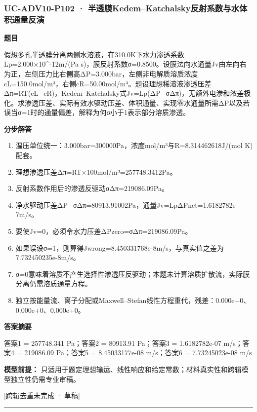 \documentclass[UTF8,11pt,a4paper]{ctexart}
\begin{document}
\subsubsection*{UC-ADV10-P102 · 半透膜Kedem–Katchalsky反射系数与水体积通量反演}
\noindent\textbf{题目}\par
假想多孔半透膜分离两侧水溶液，在310.0K下水力渗透系数Lp=2.000×10\textasciicircum{}-12m/(Pa s)，膜反射系数σ=0.8500。设膜法向水通量Jv由左向右为正，左侧压力比右侧高ΔP=3.000bar，左侧非电解质溶质浓度cL=150.0mol/m³，右侧cR=50.00mol/m³。题设理想稀溶液渗透压差Δπ=RT(cL−cR)，Kedem–Katchalsky式Jv=Lp(ΔP−σΔπ)，无额外电渗和浓差极化。求渗透压差、实际有效水驱动压差、体积通量、实现零水通量所需ΔP以及若误当σ=1时的通量偏差，解释为何σ小于1表示部分溶质渗透。\par
\medskip\noindent\textbf{分步解答}
\begin{enumerate}
\item 温压单位统一：3.000bar=300000Pa，浓度mol/m³与R=8.314462618J/(mol K)配套。
\item 理想渗透压差Δπ=RT×100mol/m³=257748.3412Pa。
\item 反射系数作用后的渗透反驱动σΔπ=219086.09Pa。
\item 净水驱动压差ΔP−σΔπ=80913.91002Pa，通量Jv=LpΔPnet=1.6182782e-7m/s。
\item 要使Jv=0，必须令水力压差ΔPzero=σΔπ=219086.09Pa。
\item 如果误设σ=1，则算得Jwrong=8.450331768e-8m/s，与真实值之差为7.732450235e-8m/s。
\item σ=0意味着溶质不产生选择性渗透压反驱动；本题未计算溶质扩散流，实际膜分离仍需溶质通量方程。
\item 独立按能量流、离子分配或Maxwell–Stefan线性方程重代，残差：0.000e+0、0.000e+0、0.000e+0。
\end{enumerate}
\noindent\textbf{答案摘要}\par
答案1 = 257748.341 Pa；答案2 = 80913.91 Pa；答案3 = 1.6182782e-07 m/s；答案4 = 219086.09 Pa；答案5 = 8.45033177e-08 m/s；答案6 = 7.73245023e-08 m/s\par
\noindent\textbf{模型前提：}
只适用于题定理想输运、线性响应和给定常数；材料真实性和跨辑模型独立性仍需专业审稿。\par
\noindent\textcolor{red!65!black}{[跨辑去重未完成 · 草稿]} \par
\medskip\hrule\medskip
{}
\end{document}
